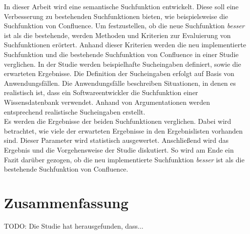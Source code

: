 In dieser Arbeit wird eine semantische Suchfunktion entwickelt.
Diese soll eine Verbesserung zu bestehenden Suchfunktionen bieten, wie beispielsweise die Suchfunktion von Confluence.
Um festzustellen, ob die neue Suchfunktion \textit{besser} ist als die bestehende, werden Methoden und Kriterien zur Evaluierung von Suchfunktionen erörtert.
Anhand dieser Kriterien werden die neu implementierte Suchfunktion und die bestehende Suchfunktion von Confluence in einer Studie verglichen.
In der Studie werden beispielhafte Sucheingaben definiert, sowie die erwarteten Ergebnisse.
Die Definition der Sucheingaben erfolgt auf Basis von Anwendungsfällen.
Die Anwendungsfälle beschreiben Situationen, in denen es realistisch ist, dass ein Softwareentwickler die Suchfunktion einer Wissensdatenbank verwendet.
Anhand von Argumentationen werden entsprechend realistische Sucheingaben erstellt.\\

Es werden die Ergebnisse der beiden Suchfunktionen verglichen.
Dabei wird betrachtet, wie viele der erwarteten Ergebnisse in den Ergebnislisten vorhanden sind.
Dieser Parameter wird statistisch ausgewertet.
Anschließend wird das Ergebnis und die Vorgehensweise der Studie diskutiert.
So wird am Ende ein Fazit darüber gezogen, ob die neu implementierte Suchfunktion \textit{besser} ist als die bestehende Suchfunktion von Confluence.

%
%
%
\section*{Zusammenfassung}
TODO: Die Studie hat herausgefunden, dass...